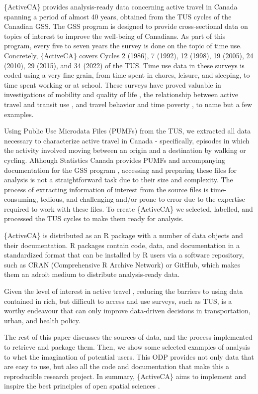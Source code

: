 \documentclass[Royal,times,sageh]{sagej}
\begin{document}
\{ActiveCA\} provides analysis-ready data concerning active travel in
Canada spanning a period of almost 40 years, obtained from the TUS
cycles of the Canadian GSS. The GSS program is designed to provide
cross-sectional data on topics of interest to improve the well-being of
Canadians. As part of this program, every five to seven years the survey
is done on the topic of time use. Concretely, \{ActiveCA\} covers Cycles
2 (1986), 7 (1992), 12 (1998), 19 (2005), 24 (2010), 29 (2015), and 34
(2022) of the TUS. Time use data in these surveys is coded using a very
fine grain, from time spent in chores, leisure, and sleeping, to time
spent working or at school. These surveys have proved valuable in
investigations of mobility and quality of life
\citep{spinneyTransport2009}, the relationship between active travel and
transit use \citep{lachapelleLonger2016}, and travel behavior and time
poverty \citep{kimFacing2024}, to name but a few examples.

Using Public Use Microdata Files (PUMFs) from the TUS, we extracted all
data necessary to characterize active travel in Canada - specifically,
episodes in which the activity involved moving between an origin and a
destination by walking or cycling. Although Statistics Canada provides
PUMFs and accompanying documentation for the GSS program
\citep[see][]{statisticscanada2024}, accessing and preparing these files
for analysis is not a straightforward task due to their size and
complexity. The process of extracting information of interest from the
source files is time-consuming, tedious, and challenging and/or prone to
error due to the expertise required to work with these files. To create
\{ActiveCA\} we selected, labelled, and processed the TUS cycles to make
them ready for analysis.

\{ActiveCA\} is distributed as an R package with a number of data
objects and their documentation. R packages contain code, data, and
documentation in a standardized format that can be installed by R users
via a software repository, such as CRAN (Comprehensive R Archive
Network) or GitHub, which makes them an adroit medium to distribute
analysis-ready data.

Given the level of interest in active travel
\citep[e.g.,][]{mccurdySupport2023}, reducing the barriers to using data
contained in rich, but difficult to access and use surveys, such as TUS,
is a worthy endeavour that can only improve data-driven decisions in
transportation, urban, and health policy.

The rest of this paper discusses the sources of data, and the process
implemented to retrieve and package them. Then, we show some selected
examples of analysis to whet the imagination of potential users. This
ODP provides not only data that are easy to use, but also all the code
and documentation that make this a reproducible research project. In
summary, \{ActiveCA\} aims to implement and inspire the best principles
of open spatial sciences \citep{paez_open_2021, brunsdon_opening_2021}.
\end{document}
